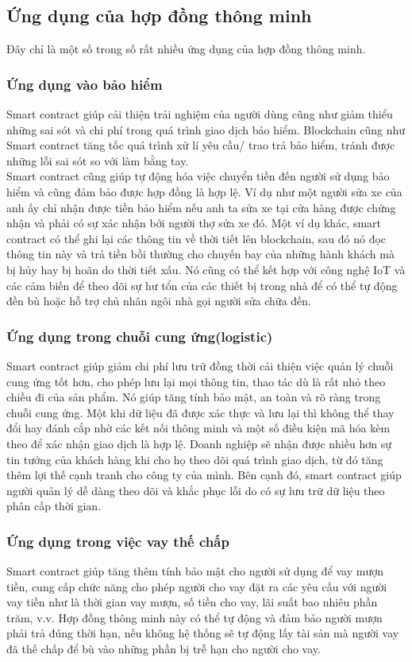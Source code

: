 \documentclass[a4paper]{article}
\begin{document}
\subsection{Ứng dụng của hợp đồng thông minh}
Đây chỉ là một số trong số rất nhiều ứng dụng của hợp đồng thông minh.
\subsubsection{Ứng dụng vào bảo hiểm}
Smart contract giúp cải thiện trải nghiệm của người dùng cũng như giảm thiểu những sai sót và chi phí trong quá trình giao dịch bảo hiểm. Blockchain cũng như Smart contract tăng tốc quá trình xử lí yêu cầu/ trao trả bảo hiểm, tránh được những lỗi sai sót so với làm bằng tay.\\
Smart contract cũng giúp tự động hóa việc chuyển tiền đến người sử dụng bảo hiểm và cũng đảm bảo được hợp đồng là hợp lệ. Ví dụ như một người sửa xe của anh ấy chỉ nhận được tiền bảo hiểm nếu anh ta sửa xe tại cửa hàng được chứng nhận và phải có sự xác nhận bởi người thợ sửa xe đó. Một ví dụ khác, smart contract có thể ghi lại các thông tin về thời tiết lên blockchain, sau đó nó đọc thông tin này và trả tiền bồi thường cho chuyến bay của những hành khách mà bị hủy hay bị hoãn do thời tiết xấu. Nó cũng có thể kết hợp với công nghệ IoT và các cảm biến để theo dõi sự hư tổn của các thiết bị trong nhà để có thể tự động đền bù hoặc hỗ trợ chủ nhân ngôi nhà gọi người sửa chữa đến.

\subsubsection{Ứng dụng trong chuỗi cung ứng(logistic)}

Smart contract giúp giảm chi phí lưu trữ đồng thời cải thiện việc quản lý chuỗi cung ứng tốt hơn, cho phép lưu lại mọi thông tin, thao tác dù là rất nhỏ theo chiều đi của sản phẩm. Nó giúp tăng tính bảo mật, an toàn và rõ ràng trong chuỗi cung ứng. Một khi dữ liệu đã được xác thực và lưu lại thì không thể thay đổi hay đánh cắp nhờ các kết nối thông minh và một số điều kiện mã hóa kèm theo để xác nhận giao dịch là hợp lệ. Doanh nghiệp sẽ nhận được nhiều hơn sự tin tưởng của khách hàng khi cho họ theo dõi quá trình giao dịch, từ đó tăng thêm lợi thế cạnh tranh cho công ty của mình. Bên cạnh đó, smart contract giúp người quản lý dễ dàng theo dõi và khắc phục lỗi do có sự lưu trữ dữ liệu theo phân cấp thời gian.

\subsubsection{Ứng dụng trong việc vay thế chấp}
Smart contract giúp tăng thêm tính bảo mật cho người sử dụng để vay mượn tiền, cung cấp chức năng cho phép người cho vay đặt ra các yêu cầu với người vay tiền như là thời gian vay mượn, số tiền cho vay, lãi suất bao nhiêu phần trăm, v.v. Hợp đồng thông minh này có thể tự động và đảm bảo người mượn phải trả đúng thời hạn, nếu không hệ thống sẽ tự động lấy tài sản mà người vay đã thế chấp để bù vào những phần bị trễ hạn cho người cho vay.
\end{document}
